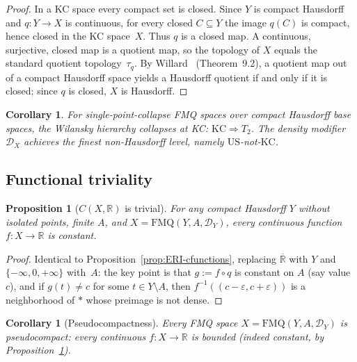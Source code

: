 \documentclass[11pt]{article}
\newtheorem{proposition}[theorem]{Proposition}
\newtheorem{corollary}[theorem]{Corollary}
\theoremstyle{definition}
\theoremstyle{remark}
\begin{document}
\begin{proof}
In a KC space every compact set is closed.
Since $Y$ is compact Hausdorff and $q\colon Y \to X$ is continuous,
for every closed $C \subseteq Y$ the image $q(C)$ is compact, hence
closed in the KC space~$X$.
Thus $q$ is a closed map.
A continuous, surjective, closed map is a quotient map, so the
topology of $X$ equals the standard quotient topology~$\tau_q$.
By Willard~\cite{bib:willard} (Theorem~9.2), a quotient map out of a
compact Hausdorff space yields a Hausdorff quotient if and only if it
is closed; since $q$ is closed, $X$ is Hausdorff.
\end{proof}

\begin{corollary}\label{cor:barrier}
For single-point-collapse FMQ spaces over compact Hausdorff base
spaces, the Wilansky hierarchy collapses at KC:
$\mathrm{KC} \Rightarrow T_2$.
The density modifier $\mathcal{D}_X$ achieves the finest
non-Hausdorff level, namely $\mathrm{US}$-not-$\mathrm{KC}$.
\end{corollary}

\subsection{Functional triviality}

\begin{proposition}[$C(X, \mathbb{R})$ is trivial]\label{prop:cfunctions}
For any compact Hausdorff $Y$ without isolated points, finite $A$, and
$X = \mathrm{FMQ}(Y, A, \mathcal{D}_Y)$, every continuous function
$f\colon X \to \mathbb{R}$ is constant.
\end{proposition}

\begin{proof}
Identical to Proposition~\ref{prop:ERI-cfunctions}, replacing
$\overline{\mathbb{R}}$ with $Y$ and
$\{-\infty,0,+\infty\}$ with~$A$: the key point is that
$g := f \circ q$ is constant on $A$ (say value $c$), and if
$g(t) \neq c$ for some $t \in Y \setminus A$, then
$f^{-1}((c-\varepsilon, c+\varepsilon))$ is a neighborhood of
$\ast$ whose preimage is not dense.
\end{proof}

\begin{corollary}[Pseudocompactness]\label{cor:pseudocompact}
Every FMQ space $X = \mathrm{FMQ}(Y,A,\mathcal{D}_Y)$ is pseudocompact:
every continuous $f\colon X \to \mathbb{R}$ is bounded
\textup{(}indeed constant, by Proposition~\textup{\ref{prop:cfunctions})}.
\end{corollary}
\end{document}
